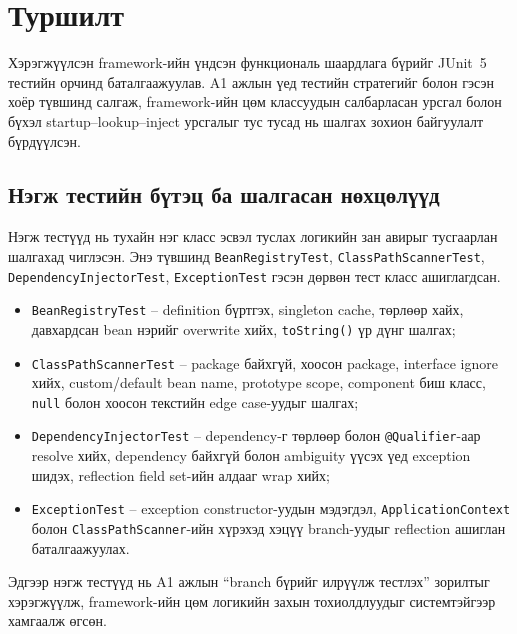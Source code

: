 \section{Туршилт}

Хэрэгжүүлсэн framework-ийн үндсэн функциональ шаардлага бүрийг
JUnit~5 тестийн орчинд баталгаажуулав. A1 ажлын үед тестийн
стратегийг  болон  гэсэн хоёр түвшинд
салгаж, framework-ийн цөм классуудын салбарласан урсгал болон
бүхэл startup--lookup--inject урсгалыг тус тусад нь шалгах зохион
байгуулалт бүрдүүлсэн.

\subsection{Нэгж тестийн бүтэц ба шалгасан нөхцөлүүд}

Нэгж тестүүд нь тухайн нэг класс эсвэл туслах логикийн зан авирыг
тусгаарлан шалгахад чиглэсэн. Энэ түвшинд \texttt{BeanRegistryTest},
\texttt{ClassPathScannerTest}, \texttt{DependencyInjectorTest},
\texttt{ExceptionTest} гэсэн дөрвөн тест класс ашиглагдсан.

\begin{itemize}
    \item \texttt{BeanRegistryTest} -- definition бүртгэх, singleton cache,
    төрлөөр хайх, давхардсан bean нэрийг overwrite хийх, \texttt{toString()}
    үр дүнг шалгах;
    \item \texttt{ClassPathScannerTest} -- package байхгүй, хоосон package,
    interface ignore хийх, custom/default bean name, prototype scope,
    component биш класс, \texttt{null} болон хоосон текстийн edge case-уудыг шалгах;
    \item \texttt{DependencyInjectorTest} -- dependency-г төрлөөр болон
    \texttt{@Qualifier}-аар resolve хийх, dependency байхгүй болон ambiguity
    үүсэх үед exception шидэх, reflection field set-ийн алдааг wrap хийх;
    \item \texttt{ExceptionTest} -- exception constructor-уудын мэдэгдэл,
    \texttt{ApplicationContext} болон \texttt{ClassPathScanner}-ийн хүрэхэд
    хэцүү branch-уудыг reflection ашиглан баталгаажуулах.
\end{itemize}

Эдгээр нэгж тестүүд нь A1 ажлын ``branch бүрийг илрүүлж тестлэх''
зорилтыг хэрэгжүүлж, framework-ийн цөм логикийн захын тохиолдлуудыг
системтэйгээр хамгаалж өгсөн.

